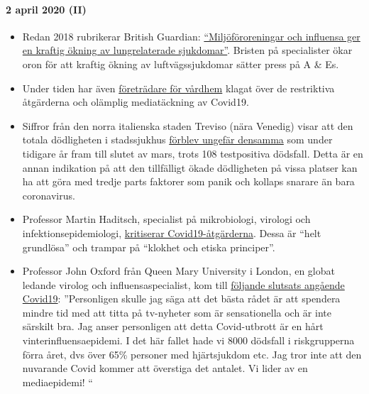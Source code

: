 \hypertarget{2-april-2020-ii}{%
\paragraph{2 april 2020 (II)}\label{2-april-2020-ii}}

\begin{itemize}
\tightlist
\item
  Redan 2018 rubrikerar British Guardian:
  \href{https://www.theguardian.com/society/2018/dec/09/steep-rise-lung-related-illness-hospitals-nhs}{``Miljöföroreningar
  och influensa ger en kraftig ökning av lungrelaterade sjukdomar''}.
  Bristen på specialister ökar oron för att kraftig ökning av
  luftvägssjukdomar sätter press på A \& Es.
\item
  Under tiden har även
  \href{https://pflege-prisma.de/2020/03/31/sterbezahlen-in-pflegeheimen/}{företrädare
  för vårdhem} klagat över de restriktiva åtgärderna och olämplig
  mediatäckning av Covid19.
\item
  Siffror från den norra italienska staden Treviso (nära Venedig) visar
  att den totala dödligheten i stadssjukhus
  \href{https://swprs.files.wordpress.com/2020/04/reppublica-treviso.jpg}{förblev
  ungefär densamma} som under tidigare år fram till slutet av mars,
  trots 108 testpositiva dödsfall. Detta är en annan indikation på att
  den tillfälligt ökade dödligheten på vissa platser kan ha att göra med
  tredje parts faktorer som panik och kollaps snarare än bara
  coronavirus.
\item
  Professor Martin Haditsch, specialist på mikrobiologi, virologi och
  infektionsepidemiologi,
  \href{https://www.youtube.com/watch?v=PtzHH8DhgZM}{kritiserar
  Covid19-åtgärderna}. Dessa är ``helt grundlösa'' och trampar på
  ``klokhet och etiska principer''.
\item
  Professor John Oxford från Queen Mary University i London, en globat
  ledande virolog och influensaspecialist, kom till
  \href{https://novuscomms.com/2020/03/31/a-view-from-the-hvivo-open-orphan-orph-laboratory-professor-john-oxford/}{följande
  slutsats angående Covid19}: ''Personligen skulle jag säga att det
  bästa rådet är att spendera mindre tid med att titta på tv-nyheter som
  är sensationella och är inte särskilt bra. Jag anser personligen att
  detta Covid-utbrott är en hårt vinterinfluensaepidemi. I det här
  fallet hade vi 8000 dödsfall i riskgrupperna förra året, dvs över 65\%
  personer med hjärtsjukdom etc. Jag tror inte att den nuvarande Covid
  kommer att överstiga det antalet. Vi lider av en mediaepidemi! ``
\end{itemize}

